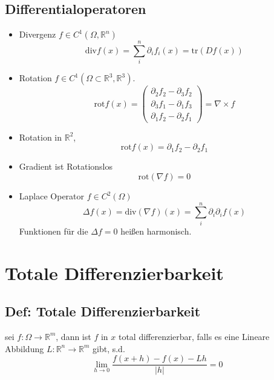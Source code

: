 \subsection{Differentialoperatoren}
\begin{itemize}
	\item Divergenz $f\in C^1(\Omega,\mathbb R^n)$
		$$
		\text{div} f(x) = \sum_i^n \partial_i f_i(x) = \text{tr}(Df(x))
		$$
	\item Rotation $f\in C^1(\Omega\subset\mathbb R^3, \mathbb R^3)$.
		$$
		\text{rot} f(x) = 
		\begin{pmatrix}
			\partial_2 f_2 - \partial_3 f_2\\
			\partial_3 f_1 - \partial_1 f_3\\
			\partial_1 f_2 - \partial_2 f_1
		\end{pmatrix} =
		\nabla \times f
		$$
	\item Rotation in $\mathbb R^2$,
		$$
		\text{rot}f(x) = \partial_1 f_2 - \partial_2 f_1
		$$
	\item Gradient ist Rotationslos
		$$
		\text{rot}(\nabla f) = 0
		$$
	\item Laplace Operator $f\in C^2(\Omega)$
		$$
		\Delta f(x) = \text{div}(\nabla f)(x) = \sum_i^n \partial_i \partial_i f(x)
		$$
		Funktionen für die $\Delta f = 0$ heißen harmonisch.
\end{itemize}

\section{Totale Differenzierbarkeit}
\subsection{Def: Totale Differenzierbarkeit}
sei $f:\Omega\rightarrow\mathbb R^m$, dann ist $f$ in $x$ total differenzierbar, falls es eine Lineare Abbildung $L:\mathbb R^n\rightarrow \mathbb R^m$ gibt, s.d.
$$
\lim_{h\rightarrow 0}\frac{f(x+h) - f(x) - Lh}{|h|} = 0
$$


